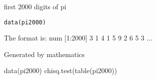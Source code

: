 \begin{Description}\relax
first 2000 digits of pi
\end{Description}
\begin{Usage}
\begin{verbatim}data(pi2000)\end{verbatim}
\end{Usage}
\begin{Format}\relax
The format is:
num [1:2000] 3 1 4 1 5 9 2 6 5 3 ...
\end{Format}
\begin{Source}\relax
Generated by mathematics
\end{Source}
\begin{Examples}
\begin{ExampleCode}
data(pi2000)
chisq.test(table(pi2000))
\end{ExampleCode}
\end{Examples}

